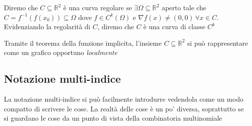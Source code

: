 \documentclass[openany, italian]{book}
\begin{document}
\begin{definition}
Diremo che $C \subseteq \mathbb{R}^2$ è una curva regolare se $\exists \Omega \subseteq \mathbb{R}^2$ aperto tale che $C = f^{-1}(f(x_0)) \subseteq \Omega$ dove $f \in C^k (\Omega)$ e $\nabla f(x) \neq (0, 0) \, \forall x \in C$. \\
Evidenziando la regolarità di $C$, diremo che $C$ è una curva di classe $C^k$
\end{definition}
\begin{remark}
Tramite il teorema della funzione implicita, l'insieme $C \subseteq \mathbb{R}^2$ si può rappresentare come un grafico opportuno \emph{localmente}
\end{remark}





\begin{appendices}
\chapter{Notazione multi-indice}
La notazione multi-indice si può facilmente introdurre vedendola come un modo compatto di scrivere le cose. La realtà delle cose è un po' diversa, soprattutto se si guardano le cose da un punto di vista della combinatoria multinomiale
\end{appendices}
\end{document}
